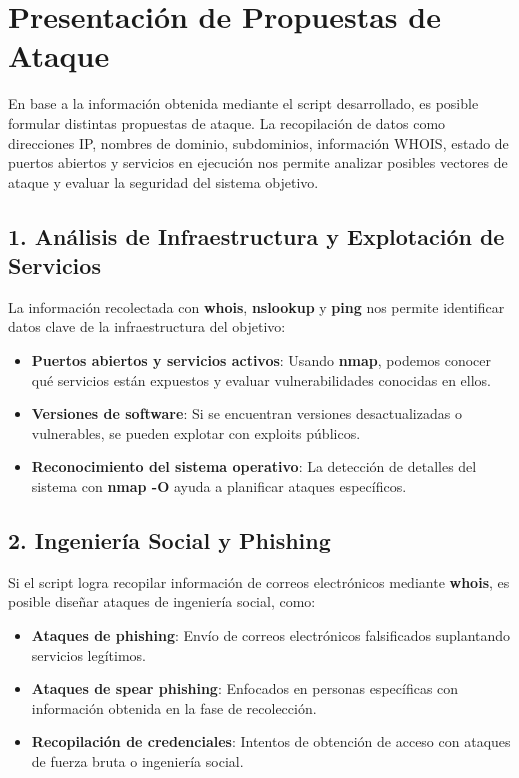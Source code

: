 \section{Presentación de Propuestas de Ataque}

En base a la información obtenida mediante el script desarrollado, es posible formular distintas propuestas de ataque. La recopilación de datos como direcciones IP, nombres de dominio, subdominios, información WHOIS, estado de puertos abiertos y servicios en ejecución nos permite analizar posibles vectores de ataque y evaluar la seguridad del sistema objetivo.

\subsection{1. Análisis de Infraestructura y Explotación de Servicios}
La información recolectada con \textbf{whois}, \textbf{nslookup} y \textbf{ping} nos permite identificar datos clave de la infraestructura del objetivo:
\begin{itemize}
    \item \textbf{Puertos abiertos y servicios activos}: Usando \textbf{nmap}, podemos conocer qué servicios están expuestos y evaluar vulnerabilidades conocidas en ellos.
    \item \textbf{Versiones de software}: Si se encuentran versiones desactualizadas o vulnerables, se pueden explotar con exploits públicos.
    \item \textbf{Reconocimiento del sistema operativo}: La detección de detalles del sistema con \textbf{nmap -O} ayuda a planificar ataques específicos.
\end{itemize}

\subsection{2. Ingeniería Social y Phishing}
Si el script logra recopilar información de correos electrónicos mediante \textbf{whois}, es posible diseñar ataques de ingeniería social, como:
\begin{itemize}
    \item \textbf{Ataques de phishing}: Envío de correos electrónicos falsificados suplantando servicios legítimos.
    \item \textbf{Ataques de spear phishing}: Enfocados en personas específicas con información obtenida en la fase de recolección.
    \item \textbf{Recopilación de credenciales}: Intentos de obtención de acceso con ataques de fuerza bruta o ingeniería social.
\end{itemize}

